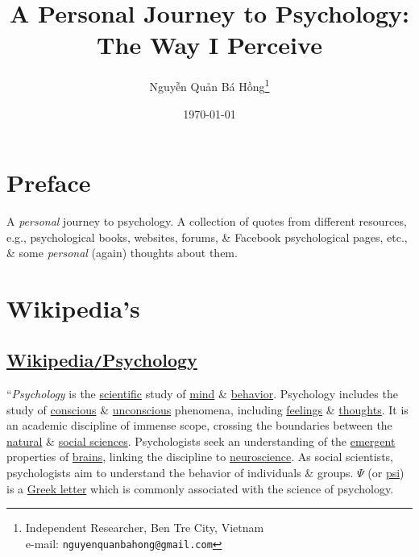 \documentclass[oneside]{book}
\title{A Personal Journey to Psychology: The Way I Perceive}
\author{\selectlanguage{vietnamese} Nguyễn Quản Bá Hồng\footnote{Independent Researcher, Ben Tre City, Vietnam\\e-mail: \texttt{nguyenquanbahong@gmail.com}}}
\date{\today}
\numberwithin{equation}{section}
\begin{document}
\maketitle

\chapter*{Preface}

A \textit{personal} journey to psychology. A collection of quotes from different resources, e.g., psychological books, websites, forums, \& Facebook psychological pages, etc., \& some \textit{personal} (again) thoughts about them.


\newpage
\tableofcontents


\chapter{Wikipedia's}

\section{\href{https://en.wikipedia.org/wiki/Psychology}{Wikipedia\texttt{/}Psychology}}
``\textit{Psychology} is the \href{https://en.wikipedia.org/wiki/Science}{scientific} study of \href{https://en.wikipedia.org/wiki/Mind}{mind} \& \href{https://en.wikipedia.org/wiki/Behavior}{behavior}. Psychology includes the study of \href{https://en.wikipedia.org/wiki/Consciousness}{conscious} \& \href{https://en.wikipedia.org/wiki/Unconscious_mind}{unconscious} phenomena, including \href{https://en.wikipedia.org/wiki/Feeling}{feelings} \& \href{https://en.wikipedia.org/wiki/Thought}{thoughts}. It is an academic discipline of immense scope, crossing the boundaries between the \href{https://en.wikipedia.org/wiki/Natural_science}{natural} \& \href{https://en.wikipedia.org/wiki/Social_science}{social sciences}. Psychologists seek an understanding of the \href{https://en.wikipedia.org/wiki/Emergence}{emergent} properties of \href{https://en.wikipedia.org/wiki/Brain}{brains}, linking the discipline to \href{https://en.wikipedia.org/wiki/Neuroscience}{neuroscience}. As social scientists, psychologists aim to understand the behavior of individuals \& groups. $\Psi$ (or \href{https://en.wikipedia.org/wiki/Psi_(Greek)}{psi}) is a \href{https://en.wikipedia.org/wiki/Greek_alphabet}{Greek letter} which is commonly associated with the science of psychology.
\end{document}
